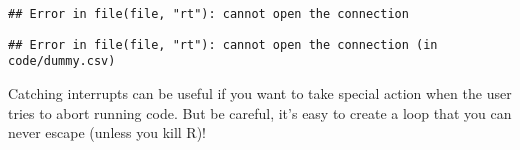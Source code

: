 \begin{Shaded}
\begin{Highlighting}[]
\StringTok{ }
  \NormalTok{(} 
\OperatorTok{$}\StringTok{ }\OperatorTok{$}\NormalTok{)}
\NormalTok{  \})}
\NormalTok{\}}
\NormalTok{(}\NormalTok{)}
\end{Highlighting}
\end{Shaded}

\begin{verbatim}
## Error in file(file, "rt"): cannot open the connection
\end{verbatim}

\begin{Shaded}
\begin{Highlighting}[]
\NormalTok{(}\NormalTok{)}
\end{Highlighting}
\end{Shaded}

\begin{verbatim}
## Error in file(file, "rt"): cannot open the connection (in code/dummy.csv)
\end{verbatim}

Catching interrupts can be useful if you want to take special action
when the user tries to abort running code. But be careful, it's easy to
create a loop that you can never escape (unless you kill R)!

\begin{Shaded}
\begin{Highlighting}[]
\StringTok{ }
\OperatorTok{<}\StringTok{ }\NormalTok{) \{}
  \NormalTok{(\{}
    \NormalTok{(}\NormalTok{)}
    \NormalTok{(}\NormalTok{)}
\NormalTok{  \}, } 
    \NormalTok{(}\NormalTok{)}
\StringTok{ }\OperatorTok{+}\StringTok{ }
\NormalTok{  \})}
\NormalTok{\}}
\end{Highlighting}
\end{Shaded}

